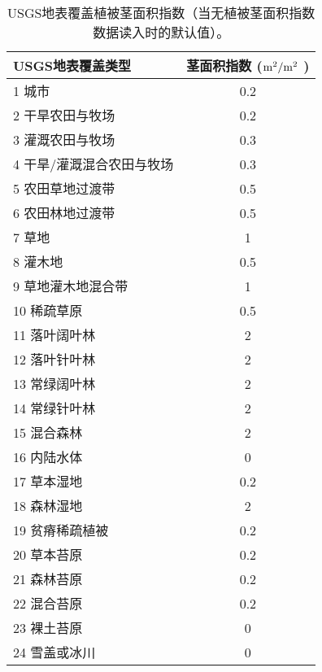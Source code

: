 \begin{table}[]
\centering
\caption{USGS地表覆盖植被茎面积指数（当无植被茎面积指数数据读入时的默认值）。}
\label{tab:USGS地表覆盖植被茎面积指数}
\begin{tabular}{@{}lc@{}}
\toprule
USGS地表覆盖类型     & 茎面积指数 ($\rm m^2/m^2$ ) \\ \midrule
1 城市           & 0.2       \\
2 干旱农田与牧场      & 0.2       \\
3 灌溉农田与牧场      & 0.3       \\
4 干旱/灌溉混合农田与牧场 & 0.3       \\
5 农田草地过渡带      & 0.5       \\
6 农田林地过渡带      & 0.5       \\
7 草地           & 1         \\
8 灌木地          & 0.5       \\
9 草地灌木地混合带     & 1         \\
10 稀疏草原        & 0.5       \\
11 落叶阔叶林       & 2         \\
12 落叶针叶林       & 2         \\
13 常绿阔叶林       & 2         \\
14 常绿针叶林       & 2         \\
15 混合森林        & 2         \\
16 内陆水体        & 0         \\
17 草本湿地        & 0.2       \\
18 森林湿地        & 2         \\
19 贫瘠稀疏植被      & 0.2       \\
20 草本苔原        & 0.2       \\
21 森林苔原        & 0.2       \\
22 混合苔原        & 0.2       \\
23 裸土苔原        & 0         \\
24 雪盖或冰川       & 0         \\\bottomrule
\end{tabular}
\end{table}

